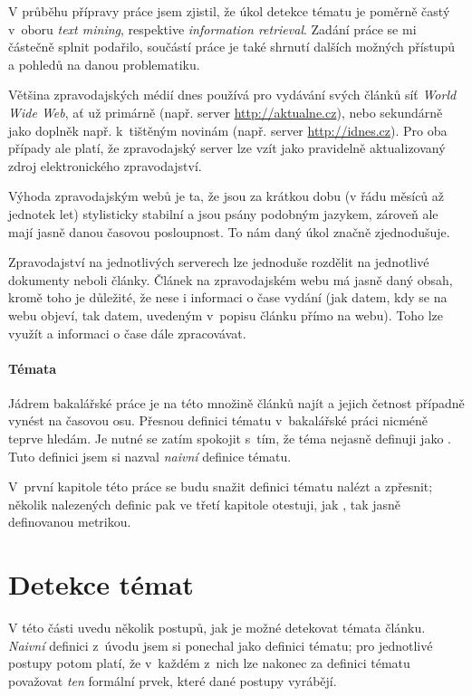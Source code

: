 \documentclass[12pt,a4paper]{report}
\begin{document}
V průběhu přípravy práce jsem zjistil, že úkol detekce tématu je poměrně častý v~oboru \emph{text mining}, respektive \emph{information retrieval}. Zadání práce se mi částečně splnit podařilo, součástí práce je také shrnutí dalších možných přístupů a pohledů na danou problematiku.

Většina zpravodajských médií dnes používá pro vydávání svých článků síť \emph{World Wide Web}, ať už primárně (např. server \url{http://aktualne.cz}), nebo sekundárně jako doplněk např. k~tištěným novinám (např. server \url{http://idnes.cz}). Pro oba případy ale platí, že zpravodajský server lze vzít jako pravidelně aktualizovaný zdroj elektronického zpravodajství.

Výhoda zpravodajským webů je ta, že jsou za krátkou dobu (v řádu měsíců až jednotek let) stylisticky stabilní a jsou psány podobným jazykem, zároveň ale mají jasně danou časovou posloupnost. To nám daný úkol značně zjednodušuje.

Zpravodajství na jednotlivých serverech lze jednoduše rozdělit na jednotlivé dokumenty neboli články. Článek na zpravodajském webu má jasně daný obsah, kromě toho je důležité, že nese i informaci o čase vydání (jak datem, kdy se na webu objeví, tak datem, uvedeným v~popisu článku přímo na webu). Toho lze využít a informaci o čase dále zpracovávat.


\subsubsection{Témata}
\label{sec:sub_temata}
Jádrem bakalářské práce je na této množině článků najít  a jejich četnost případně vynést na časovou osu. Přesnou definici tématu v~bakalářské práci nicméně teprve hledám. Je nutné se zatím spokojit s~tím, že téma nejasně definuji jako . Tuto definici jsem si nazval \emph{naivní} definice tématu.

V~první kapitole této práce se budu snažit definici tématu nalézt a zpřesnit; několik nalezených definic pak ve třetí kapitole otestuji, jak , tak jasně definovanou metrikou.


\chapter{Detekce témat}
\label{sec:hledanitemat_hlavni}
V této části uvedu několik postupů, jak je možné detekovat témata článku. \emph{Naivní} definici z~úvodu jsem si ponechal jako  definici tématu; pro jednotlivé postupy potom platí, že v~každém z~nich lze nakonec za definici tématu považovat \emph{ten} formální prvek, které dané postupy vyrábějí. 
\end{document}
